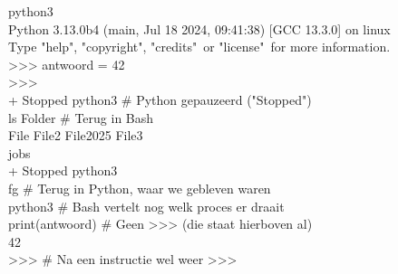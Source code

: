 \begin{bash}
\userprompt[~] python3\\
Python 3.13.0b4 (main, Jul 18 2024, 09:41:38) [GCC 13.3.0] on linux \\
Type "help", "copyright", "credits"\  or "license"\ for more information.\\
>\!>\!> antwoord = 42\\
>\!>\!> \\
\rbrack +  Stopped                 python3                  \# Python gepauzeerd ("Stopped")\\

\userprompt[~] ls Folder                                \# Terug in Bash\\
File File2 File2025 File3\\

\userprompt[~] jobs\\
\rbrack +  Stopped                 python3\\

\userprompt[~] fg                                       \# Terug in Python, waar we gebleven waren\\
python3                                                \# Bash vertelt nog welk proces er draait\\
print(antwoord)                                        \# Geen >\!>\!> (die staat hierboven al)\\
42\\
>\!>\!>                                                    \# Na een instructie wel weer >\!>\!>\\
\end{bash}

